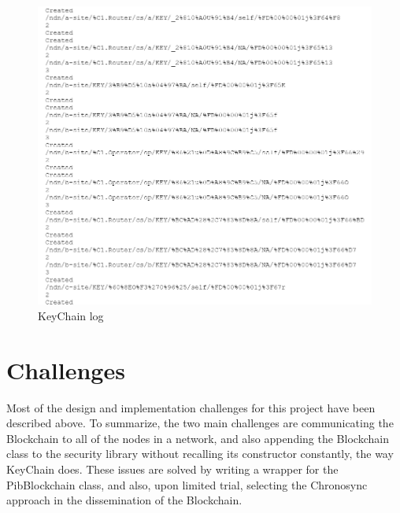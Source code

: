 \begin{figure}
\centering
\includegraphics[scale=1]{log.png}
\caption{KeyChain log}
\end{figure}




\section{Challenges}
Most of the design and implementation challenges for this project have been described above. To summarize, the two main challenges are communicating the Blockchain to all of the nodes in a network, and also appending the Blockchain class to the security library without recalling its constructor constantly, the way KeyChain does. These issues are solved by writing a wrapper for the PibBlockchain class, and also, upon limited trial, selecting the Chronosync approach in the dissemination of the Blockchain. 
